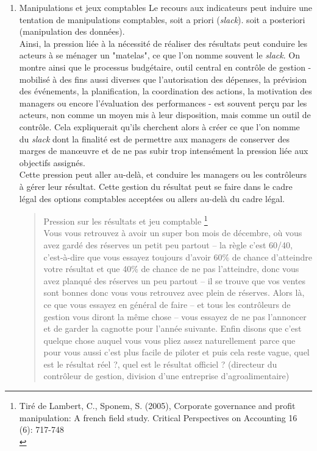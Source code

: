 \documentclass{tufte-handout}
\begin{document}
\begin{enumerate}
\item Manipulations et jeux comptables
\label{sec:org2f39e33}
Le recours aux indicateurs peut induire une tentation de manipulations comptables, soit a priori (\emph{slack}). soit a posteriori (manipulation des données).\\

Ainsi, la pression liée à la nécessité de réaliser des résultats peut conduire les acteurs à se ménager un "matelas", ce que l’on nomme souvent le \emph{slack}. On montre ainsi que le processus budgétaire, outil central en contrôle de gestion - mobilisé à des fins aussi diverses que l’autorisation des dépenses, la prévision des événements, la planification, la coordination des actions, la motivation des managers ou encore l’évaluation des performances - est souvent perçu par les acteurs, non comme un moyen mis à leur disposition, mais comme un outil de contrôle. Cela expliquerait qu’ils cherchent alors à créer ce que l’on nomme du \emph{slack} dont la finalité est de permettre aux managers de conserver des marges de manœuvre et de ne pas subir trop intensément la pression liée aux objectifs assignés.\\

Cette pression peut aller au-delà, et conduire les managers ou les contrôleurs à gérer leur résultat. Cette gestion du résultat peut se faire dans le cadre légal des options comptables acceptées ou allers au-delà du cadre légal.\\

\begin{verse}
Pression sur les résultats et jeu comptable \footnote{Tiré de Lambert, C., Sponem, S. (2005), Corporate governance and profit manipulation: A french field study. Critical Perspectives on Accounting 16 (6): 717-748\\}\\
Vous vous retrouvez à avoir un super bon mois de décembre, où vous  avez gardé des réserves un petit peu partout – la règle c’est 60/40, c’est-à-dire que vous essayez toujours d’avoir 60\% de chance d’atteindre votre résultat et que 40\% de chance de ne pas l’atteindre, donc vous avez planqué des réserves un peu partout – il se trouve que vos ventes sont bonnes donc vous vous retrouvez avec plein de réserves. Alors là, ce que vous essayez en général de faire – et tous les contrôleurs de gestion vous diront la même chose – vous essayez de ne pas l’annoncer et de garder la cagnotte pour l’année suivante. Enfin disons que c’est quelque chose auquel vous vous pliez assez naturellement parce que pour vous aussi c’est plus facile de piloter et puis cela reste vague, quel est le résultat réel ?, quel est le résultat officiel ? (directeur du contrôleur de gestion, division d’une entreprise d’agroalimentaire)\\
\end{verse}


\end{enumerate}
\end{document}
